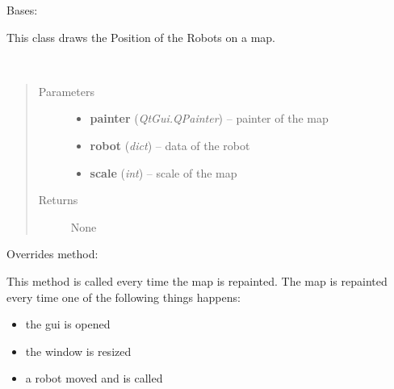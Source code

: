\documentclass[letterpaper,10pt,english]{sphinxmanual}
\begin{document}
\begin{fulllineitems}
\label{gui:gui.field.GameField}
Bases: 

This class draws the Position of the Robots on a map.

\begin{fulllineitems}
\label{gui:gui.field.GameField._draw_robot}~\begin{quote}\begin{description}
\item[{Parameters}] \leavevmode\begin{itemize}
\item {} 
\textbf{painter} (\emph{QtGui.QPainter}) -- painter of the map

\item {} 
\textbf{robot} (\emph{dict}) -- data of the robot

\item {} 
\textbf{scale} (\emph{int}) -- scale of the map

\end{itemize}

\item[{Returns}] \leavevmode
None

\end{description}\end{quote}

\end{fulllineitems}


\begin{fulllineitems}
\label{gui:gui.field.GameField.paintEvent}
Overrides method: 

This method is called every time the map is repainted.
The map is repainted every time one of the following things happens:
\begin{itemize}
\item {} 
the gui is opened

\item {} 
the window is resized

\item {} 
a robot moved and {\hyperref[gui:gui.field.GameField.setpoint]{}} is called


\end{itemize}
\end{fulllineitems}
\end{fulllineitems}
\end{document}
